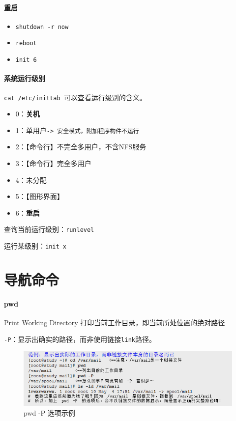 \documentclass[UTF8,a4paper,12pt]{ctexbook}
\begin{document}
			\paragraph{重启}
					\begin{itemize}[itemindent = 1em]
						\item \verb|shutdown -r now|
						\item \verb|reboot|
						\item \verb|init 6|
					\end{itemize}
					
			\paragraph{系统运行级别}\verb|cat /etc/inittab |可以查看运行级别的含义。
					\begin{itemize}[itemindent = 1em]
						\item 0：\textbf{关机}
						\item 1：单用户\verb|-> 安全模式，附加程序构件不运行|
						\item 2：【命令行】不完全多用户，不含NFS服务
						\item 3：【命令行】完全多用户
						\item 4：未分配
						\item 5：【图形界面】
						\item 6：\textbf{重启}
					\end{itemize}
				
				查询当前运行级别：\verb|runlevel|
				
				运行某级别：\verb|init x|
	
	\section{导航命令}
		\paragraph{pwd}Print Working Directory 打印当前工作目录，即当前所处位置的绝对路径
		
			\verb|-P|：显示出确实的路径，而非使用链接\verb|link|路径。
			
			\begin{figure}[h]
				\centering
				\includegraphics[scale=0.7]{figure/pwd.png}
				\caption{pwd -P 选项示例}
			\end{figure}
		
\end{document}

